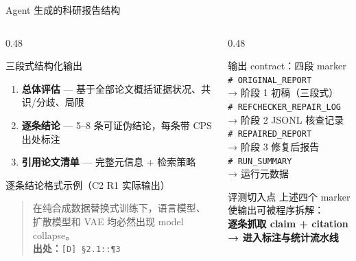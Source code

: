 \documentclass[UTF8,fontset=fandol,aspectratio=169]{ctexbeamer}
\begin{document}
\begin{frame}{Agent 生成的科研报告结构}
  \begin{columns}[T,onlytextwidth]
    \begin{column}{0.48\textwidth}
      \begin{block}{三段式结构化输出}
        \begin{enumerate}
          \setlength{\itemsep}{2pt}
          \item \textbf{总体评估} — 基于全部论文概括证据状况、共识/分歧、局限
          \item \textbf{逐条结论} — 5--8 条可证伪结论，每条带 CPS 出处标注
          \item \textbf{引用论文清单} — 完整元信息 + 检索策略
        \end{enumerate}
      \end{block}

      \begin{exampleblock}{逐条结论格式示例（C2 R1 实际输出）}
        \begin{quote}\footnotesize
          在纯合成数据替换式训练下，语言模型、扩散模型和 VAE 均必然出现 model collapse。\\
          \textbf{出处：}\texttt{[D] \S2.1::\P3}
        \end{quote}
      \end{exampleblock}
    \end{column}
    \begin{column}{0.48\textwidth}
      \begin{block}{输出 contract：四段 marker}
        \texttt{\# ORIGINAL\_REPORT}\\
        \hspace{1em}→ 阶段 1 初稿（三段式）\\
        \texttt{\# REFCHECKER\_REPAIR\_LOG}\\
        \hspace{1em}→ 阶段 2 JSONL 核查记录\\
        \texttt{\# REPAIRED\_REPORT}\\
        \hspace{1em}→ 阶段 3 修复后报告\\
        \texttt{\# RUN\_SUMMARY}\\
        \hspace{1em}→ 运行元数据
      \end{block}

      \begin{alertblock}{评测切入点}
        上述四个 marker 使输出可被程序拆解：\\
        \textbf{逐条抓取 claim + citation → 进入标注与统计流水线}
      \end{alertblock}
    \end{column}
  \end{columns}
\end{frame}
\end{document}
